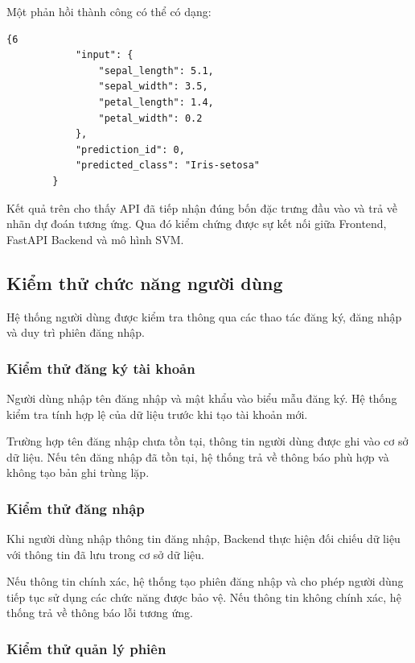 \documentclass[14pt]{extarticle}
\begin{document}
	\noindent Một phản hồi thành công có thể có dạng:
	\begin{lstlisting}[language={}, numbers=none, frame=single, basicstyle=\ttfamily\small]
		{6
			"input": {
				"sepal_length": 5.1,
				"sepal_width": 3.5,
				"petal_length": 1.4,
				"petal_width": 0.2
			},
			"prediction_id": 0,
			"predicted_class": "Iris-setosa"
		}
	\end{lstlisting}
	
	
	\noindent Kết quả trên cho thấy API đã tiếp nhận đúng bốn đặc trưng đầu vào và trả về nhãn dự đoán tương ứng. Qua đó kiểm chứng được sự kết nối giữa Frontend, FastAPI Backend và mô hình SVM.
	
	\subsection{Kiểm thử chức năng người dùng}
	
	\noindent Hệ thống người dùng được kiểm tra thông qua các thao tác đăng ký, đăng nhập và duy trì phiên đăng nhập.
	
	\subsubsection{Kiểm thử đăng ký tài khoản}
	
	\noindent Người dùng nhập tên đăng nhập và mật khẩu vào biểu mẫu đăng ký. Hệ thống kiểm tra tính hợp lệ của dữ liệu trước khi tạo tài khoản mới.
	
	\noindent Trường hợp tên đăng nhập chưa tồn tại, thông tin người dùng được ghi vào cơ sở dữ liệu. Nếu tên đăng nhập đã tồn tại, hệ thống trả về thông báo phù hợp và không tạo bản ghi trùng lặp.
	
	\subsubsection{Kiểm thử đăng nhập}
	
	\noindent Khi người dùng nhập thông tin đăng nhập, Backend thực hiện đối chiếu dữ liệu với thông tin đã lưu trong cơ sở dữ liệu.
	
	\noindent Nếu thông tin chính xác, hệ thống tạo phiên đăng nhập và cho phép người dùng tiếp tục sử dụng các chức năng được bảo vệ. Nếu thông tin không chính xác, hệ thống trả về thông báo lỗi tương ứng.
	
	\subsubsection{Kiểm thử quản lý phiên}
	
\end{document}
